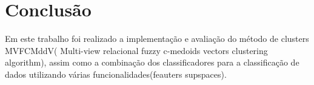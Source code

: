 \documentclass[12pt]{article}
\begin{document}
%
%
%
%
%
%


\section{Conclusão}

Em este trabalho foi realizado a implementação e avaliação do método de clusters MVFCMddV( Multi-view relacional fuzzy c-medoids vectors clustering algorithm), assim como a combinação dos classificadores para a classificação de dados utilizando várias funcionalidades(feauters supspaces). 
\end{document}
